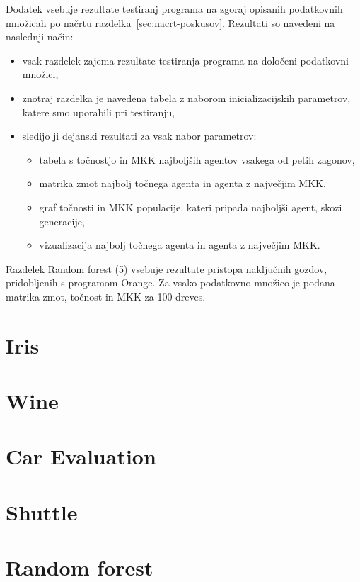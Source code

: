 Dodatek vsebuje rezultate testiranj programa na zgoraj opisanih podatkovnih množicah po načrtu razdelka~\ref{sec:nacrt-poskusov}.
Rezultati so navedeni na naslednji način:
\begin{itemize}
    \item vsak razdelek zajema rezultate testiranja programa na določeni podatkovni množici,
    \item znotraj razdelka je navedena tabela z naborom inicializacijskih parametrov, katere smo uporabili pri testiranju,
    \item sledijo ji dejanski rezultati za vsak nabor parametrov:
    \begin{itemize}
        \item tabela s točnostjo in MKK najboljših agentov vsakega od petih zagonov,
        \item matrika zmot najbolj točnega agenta in agenta z največjim MKK,
        \item graf točnosti in MKK populacije, kateri pripada najboljši agent, skozi generacije,
        \item vizualizacija najbolj točnega agenta in agenta z največjim MKK.
    \end{itemize}
\end{itemize}

Razdelek Random forest (\ref{sec:random-forest-test}) vsebuje rezultate pristopa naključnih gozdov, pridobljenih s programom Orange.
Za vsako podatkovno množico je podana matrika zmot, točnost in MKK za 100 dreves.

\section{Iris}\label{sec:dodatek-iris-test}


\section{Wine}\label{sec:dodatek-wine-test}


\section{Car Evaluation}\label{sec:dodatek-car-test}


\section{Shuttle}\label{sec:dodatek-statlog-test}


\section{Random forest}\label{sec:random-forest-test}


